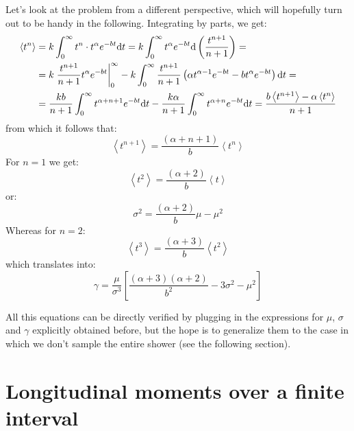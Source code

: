 \documentclass[a4paper,11pt]{article}
\newcommand{\diff}{{\rm d}}
\begin{document}
Let's look at the problem from a different perspective, which will hopefully
turn out to be handy in the following. Integrating by parts, we get:
\begin{align*}
\left< t^n \right> & = k \int_{0}^\infty t^n \cdot t^\alpha e^{-bt} \diff t =
k \int_{0}^\infty t^\alpha e^{-bt} \diff\left(\frac{t^{n+1}}{n+1}\right) =\\
&= k\left.\frac{t^{n+1}}{n+1}  t^\alpha e^{-bt}\right|_0^\infty -
k \int_0^\infty \frac{t^{n+1}}{n+1} \left(
\alpha t^{\alpha - 1}e^{-bt} - bt^\alpha e^{-bt}
\right) \diff t =\\
&= \frac{kb}{n+1} \int_{0}^\infty  t^{\alpha + n + 1} e^{-bt} \diff t -
\frac{k\alpha}{n+1} \int_{0}^\infty  t^{\alpha + n} e^{-bt} \diff t =
\frac{b \left< t^{n+1} \right> - \alpha\left< t^n \right>}{n+1}
\end{align*}
from which it follows that:
\begin{equation}
\left< t^{n+1} \right> = \frac{(\alpha + n + 1)}{b}\left< t^n \right>
\end{equation}
For $n = 1$ we get:
$$
\left< t^2 \right> = \frac{(\alpha + 2)}{b}\left< t \right>
$$
or:
\begin{equation}
\sigma^2 = \frac{(\alpha + 2)}{b}\mu - \mu^2
\end{equation}
Whereas for $n = 2$:
$$
\left< t^3 \right> = \frac{(\alpha + 3)}{b}\left< t^2 \right>
$$
which translates into:
\begin{equation}
\gamma = \frac{\mu}{\sigma^3}\left[
  \frac{(\alpha + 3)(\alpha + 2)}{b^2} - 3\sigma^2 - \mu^2
  \right]
\end{equation}

All this equations can be directly verified by plugging in the expressions
for $\mu$, $\sigma$ and $\gamma$ explicitly obtained before, but the hope is
to generalize them to the case in which we don't sample the entire shower
(see the following section).


\section{Longitudinal moments over a finite interval}
\end{document}
